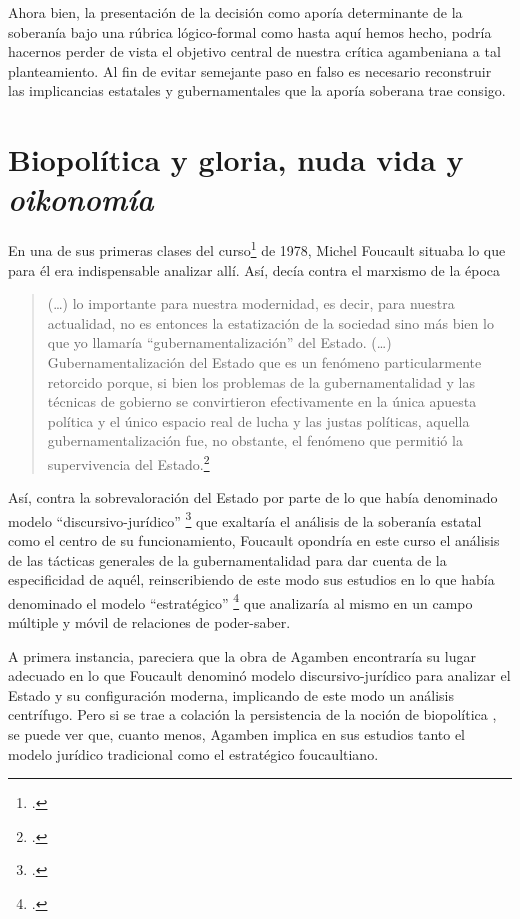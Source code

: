 Ahora bien, la presentación de la decisión como aporía determinante de la soberanía bajo una rúbrica lógico-formal como hasta aquí hemos hecho, podría hacernos perder de vista el objetivo central de nuestra crítica agambeniana a tal planteamiento. Al fin de evitar semejante paso en falso es necesario reconstruir las implicancias estatales y gubernamentales que la aporía soberana trae consigo.

\section{Biopolítica y gloria, nuda vida y \emph{oikonomía}} %

En una de sus primeras clases del curso\footcite{@7097-FOUCAULT2007} de 1978, Michel Foucault situaba lo que para él era indispensable analizar allí. Así, decía contra el marxismo de la época 

\begin{quote}
(\ldots) lo importante para nuestra modernidad, es decir, para nuestra actualidad, no es entonces la estatización de la sociedad sino más bien lo que yo llamaría \enquote{gubernamentalización} del Estado. (\ldots) Gubernamentalización del Estado que es un fenómeno particularmente retorcido porque, si bien los problemas de la gubernamentalidad y las técnicas de gobierno se convirtieron efectivamente en la única apuesta política y el único espacio real de lucha y las justas políticas, aquella gubernamentalización fue, no obstante, el fenómeno que permitió la supervivencia del Estado.\footcite[137]{@7097-FOUCAULT2007}
\end{quote}

Así, contra la sobrevaloración del Estado por parte de lo que había denominado modelo \enquote{discursivo-jurídico} \footcite[100]{@7098-FOUCAULT2003} que exaltaría el análisis de la soberanía estatal como el centro de su funcionamiento, Foucault opondría en este curso el análisis de las tácticas generales de la gubernamentalidad para dar cuenta de la especificidad de aquél, reinscribiendo de este modo sus estudios en lo que había denominado el modelo \enquote{estratégico} \footcite[113]{@7098-FOUCAULT2003} que analizaría al mismo en un campo múltiple y móvil de relaciones de poder-saber.

A primera instancia, pareciera que la obra de Agamben encontraría su lugar adecuado en lo que Foucault denominó modelo discursivo-jurídico para analizar el Estado y su configuración moderna, implicando de este modo un análisis centrífugo. Pero si se trae a colación la persistencia de la noción de biopolítica , se puede ver que, cuanto menos, Agamben implica en sus estudios tanto el modelo jurídico tradicional como el estratégico foucaultiano.

